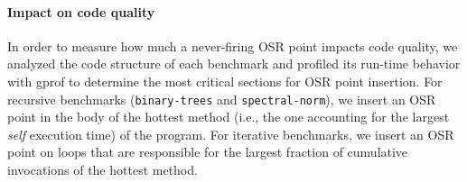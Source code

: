 \paragraph{Impact on code quality}
In order to measure how much a never-firing OSR point impacts code quality, we analyzed the code structure of each benchmark and profiled its run-time behavior with gprof to determine the most critical sections for OSR point insertion.
For recursive benchmarks ({\tt binary-trees} and {\tt spectral-norm}), we insert an OSR point in the body of the hottest method (i.e., the one accounting for the largest {\em self} execution time) of the program. For iterative benchmarks, we insert an OSR point on loops that are responsible for the largest fraction of cumulative invocations of the hottest method.
  
  
  
  
  
  
  
  
